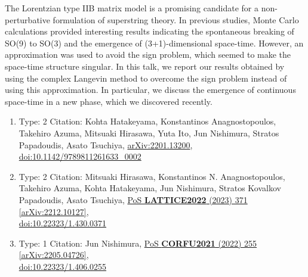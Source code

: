 \documentclass[a4paper,10pt]{article}
\begin{document}
\begin{enumerate}
The Lorentzian type IIB matrix model is a promising candidate for a non-perturbative formulation of superstring theory. In previous studies, Monte Carlo calculations provided interesting results indicating the spontaneous breaking of SO(9) to SO(3) and the emergence of (3+1)-dimensional space-time. However, an approximation was used to avoid the sign problem, which seemed to make the space-time structure singular. In this talk, we report our results obtained by using the complex Langevin method to overcome the sign problem instead of using this approximation. In particular, we discuss the emergence of continuous space-time in a new phase, which we discovered recently.
\begin{enumerate}
  \item Type: 2 Citation: Kohta Hatakeyama, Konstantinos Anagnostopoulos, Takehiro Azuma, Mitsuaki Hirasawa, Yuta Ito, Jun Nishimura, Stratos Papadoudis, Asato Tsuchiya, \href{https://arxiv.org/abs/2201.13200}{arXiv:2201.13200},\\\href{https://www.doi.org/10.1142/9789811261633_0002}{doi:10.1142/9789811261633\_0002}
  \item Type: 2 Citation: Mitsuaki Hirasawa, Konstantinos N. Anagnostopoulos, Takehiro Azuma, Kohta Hatakeyama, Jun Nishimura, Stratos Kovalkov Papadoudis, Asato Tsuchiya, \href{https://www.doi.org/10.22323/1.430.0371}{PoS {\bf LATTICE2022} (2023) 371}  \href{https://arxiv.org/abs/2212.10127}{[arXiv:2212.10127]},\\\href{https://www.doi.org/10.22323/1.430.0371}{doi:10.22323/1.430.0371}
  \item Type: 1 Citation: Jun Nishimura, \href{https://www.doi.org/10.22323/1.406.0255}{PoS {\bf CORFU2021} (2022) 255}  \href{https://arxiv.org/abs/2205.04726}{[arXiv:2205.04726]},\\\href{https://www.doi.org/10.22323/1.406.0255}{doi:10.22323/1.406.0255}

\end{enumerate}
\end{enumerate}
\end{document}

